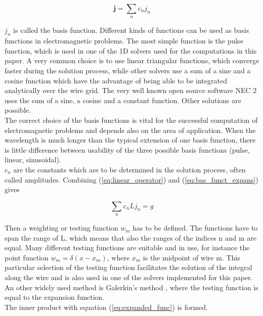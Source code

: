 \documentclass[draft,ras]{agutex}
\begin{document}
\begin{article}
\begin{equation}\label{eq:bas_funct_expans}
 \mathbf{j}=\sum_{n} c_n j_n
\end{equation}

$j_n$ is called the basis function. Different kinds of functions can be used as basis functions in electromagnetic problems. The most simple function is the pulse function, which is used in one of the 1D solvers used for the computations in this paper. A very common choice is to use linear triangular functions, which converge faster during the solution process, while other solvers use a sum of a sine and a cosine function which have the advantage of being able to be integrated analytically over the wire grid. The very well known open source software NEC 2 uses the sum of a sine, a cosine and a constant function. Other solutions are possible.\\

The correct choice of the basis functions is vital for the successful computation of electromagnetic problems and depends also on the area of application. When the wavelength is much longer than the typical extension of one basis function, there is little difference between usability of the three possible basis functions (pulse, linear, sinusoidal).\\

$c_n$ are the constants which are to be determined in the solution process, often called amplitudes. Combining (\ref{eq:linear_operator}) and (\ref{eq:bas_funct_expans}) gives

\begin{equation}\label{eq:expanded_func}
 \sum_{n} c_n L j_n=g
\end{equation}

Then a weighting or testing function $w_m$ has to be defined. The functions have to span the range of L, which means that also the ranges of the indices n and m are equal. Many different testing functions are suitable and in use, for instance the point function $w_m=\delta(x-x_m)$, where $x_m$ is the midpoint of wire m. This particular selection of the testing function facilitates the solution of the integral along the wire and is also used in one of the solvers implemented for this paper. An other widely used method is Galerkin's method \cite{harrington}, where the testing function is equal to the expansion function.\\


The inner product with equation (\ref{eq:expanded_func}) is formed.


\end{article}
\end{document}
